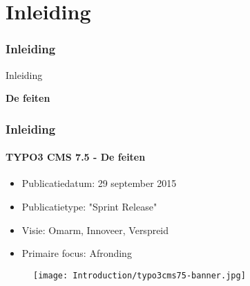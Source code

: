 %

\section{Inleiding}
\begin{frame}[fragile]
	\frametitle{Inleiding}

	\begin{center}\huge{Inleiding}\end{center}
	\begin{center}\huge{\color{typo3darkgrey}\textbf{De feiten}}\end{center}

\end{frame}

\begin{frame}[fragile]
	\frametitle{Inleiding}
	\framesubtitle{TYPO3 CMS 7.5 - De feiten}

	\begin{itemize}
		\item Publicatiedatum: 29 september 2015
		\item Publicatietype: "Sprint Release"
		\item Visie: Omarm, Innoveer, Verspreid
		\item Primaire focus: Afronding
	\end{itemize}

	\begin{figure}
		\texttt{[image: Introduction/typo3cms75-banner.jpg]}
	\end{figure}

\end{frame}

